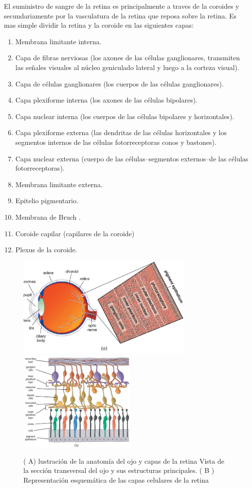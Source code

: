 El suministro de sangre de la retina es principalmente a traves de la coroides y secundariamente por la vasculatura de la retina que reposa sobre la retina. Es mas simple dividir la retina y la coroide en las siguientes capas:
\begin{enumerate}[1.]
    \item Membrana limitante interna.
    \item Capa de fibras nerviosas (los axones de las células ganglionares, transmiten las señales visuales al núcleo geniculado lateral y luego a la corteza visual).
    \item Capa de células ganglionares (los cuerpos de las células ganglionares).
    \item	Capa plexiforme interna (los axones de las células bipolares).
	\item Capa nuclear interna (los cuerpos de las células bipolares y horizontales).
	\item Capa plexiforme externa (las dendritas de las células horizontales y los segmentos internos de las células fotorreceptoras conos y bastones).
	\item Capa nuclear externa (cuerpo de las células--segmentos externos--de las células fotorreceptoras).
	\item Membrana limitante externa.
	\item Epitelio pigmentario.
	\item Membrana de Bruch .
	\item Coroide capilar (capilares de la coroide)
	\item Plexus de la coroide.

\end{enumerate}

\begin{figure}[H]
\centering
\includegraphics[height=5cm]{./Figures/retina_a.png}
\includegraphics[height=5cm]{./Figures/retina_b.png}
\label{fig:retina}
\caption{( A) lustración de la anatomía del ojo y capas de la retina  Vista de la sección transversal
del ojo y sus estructuras principales. ( B ) Representación esquemática de las capas celulares de la retina}
\end{figure}

